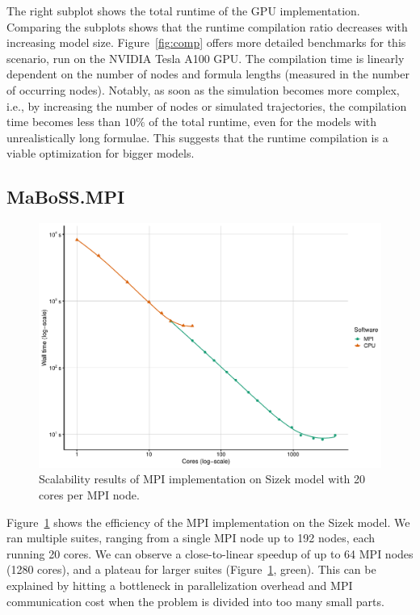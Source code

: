 \documentclass[times, twoside]{zHenriquesLab-StyleBioRxiv}
\begin{document}
The right subplot shows the total runtime of the GPU implementation. Comparing the subplots shows that the runtime compilation ratio decreases with increasing model size. Figure~\ref{fig:comp} offers more detailed benchmarks for this scenario, run on the NVIDIA Tesla A100 GPU. The compilation time is linearly dependent on the number of nodes and formula lengths (measured in the number of occurring nodes). Notably, as soon as the simulation becomes more complex, i.e., by increasing the number of nodes or simulated trajectories, the compilation time becomes less than $10\%$ of the total runtime, even for the models with unrealistically long formulae. This suggests that the runtime compilation is a viable optimization for bigger models.


\subsection*{MaBoSS.MPI}

\begin{figure}%
\centering
\includegraphics[width=.8\linewidth]{Figures/sizek_mpi.pdf}
\caption{Scalability results of MPI implementation on Sizek model with 20 cores per MPI node.}
\label{fig:sizek_results}
\end{figure}

Figure~\ref{fig:sizek_results} shows the efficiency of the MPI implementation on the Sizek model. We ran multiple suites, ranging from a single MPI node up to 192 nodes, each running 20 cores. We can observe a close-to-linear speedup of up to 64 MPI nodes (1280 cores), and a plateau for larger suites (Figure~\ref{fig:sizek_results}, green). This can be explained by hitting a bottleneck in parallelization overhead and MPI communication cost when the problem is divided into too many small parts.
\end{document}
